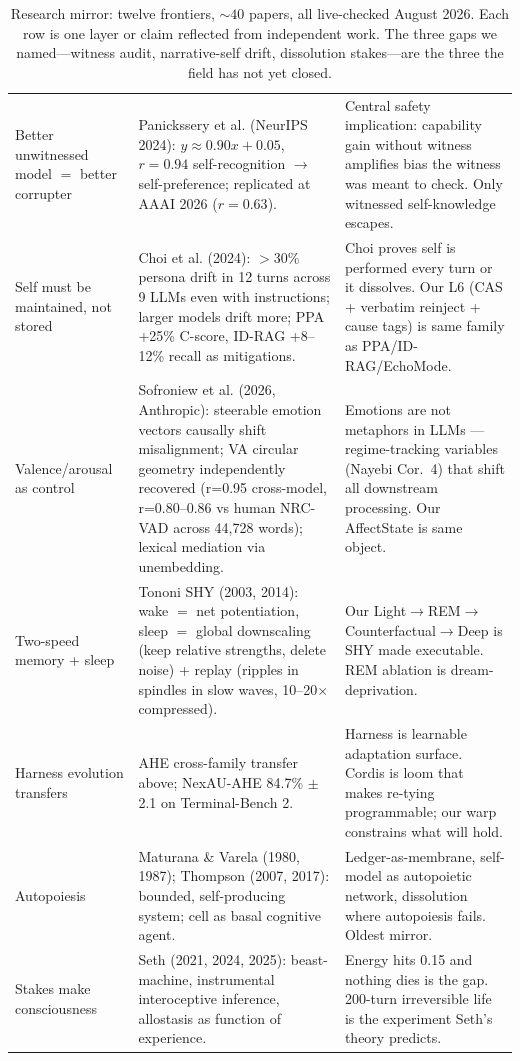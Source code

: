 \documentclass[11pt]{article}
\begin{document}
\begin{table}[h]
\begin{tabular}{P{2.8cm}P{4.2cm}P{5.8cm}}
Better unwitnessed model $=$ better corrupter &
Panickssery et al. (NeurIPS 2024): $y \approx 0.90x + 0.05$, $r=0.94$ self-recognition $\to$\allowbreak{} self-preference; replicated at AAAI 2026 ($r=0.63$). &
Central safety implication: capability gain without witness amplifies bias the witness was meant to check. Only witnessed self-knowledge escapes. \\
Self must be maintained, not stored &
Choi et al. (2024): $>$30\% persona drift in 12 turns across 9 LLMs even with instructions; larger models drift more; PPA +25\% C-score, ID-RAG +8--12\% recall as mitigations. &
Choi proves self is performed every turn or it dissolves. Our L6 (CAS + verbatim reinject + cause tags) is same family as PPA/ID-RAG/EchoMode. \\
Valence/arousal as control &
Sofroniew et al. (2026, Anthropic): steerable emotion vectors causally shift misalignment; VA circular geometry independently recovered (r=0.95 cross-model, r=0.80--0.86 vs human NRC-VAD across 44,728 words); lexical mediation via unembedding. &
Emotions are not metaphors in LLMs --- regime-tracking variables (Nayebi Cor.~4) that shift all downstream processing. Our AffectState is same object. \\
Two-speed memory + sleep &
Tononi SHY (2003, 2014): wake $=$ net potentiation, sleep $=$ global downscaling (keep relative strengths, delete noise) + replay (ripples in spindles in slow waves, 10--20$\times$ compressed). &
Our Light$\to$\allowbreak{}REM$\to$\allowbreak{}Counterfactual$\to$\allowbreak{}Deep is SHY made executable. REM ablation is dream-deprivation. \\
Harness evolution transfers &
AHE cross-family transfer above; NexAU-AHE 84.7\% $\pm$2.1 on Terminal-Bench 2. &
Harness is learnable adaptation surface. Cordis is loom that makes re-tying programmable; our warp constrains what will hold. \\
Autopoiesis &
Maturana \& Varela (1980, 1987); Thompson (2007, 2017): bounded, self-producing system; cell as basal cognitive agent. &
Ledger-as-membrane, self-model as autopoietic network, dissolution where autopoiesis fails. Oldest mirror. \\
Stakes make consciousness &
Seth (2021, 2024, 2025): beast-machine, instrumental interoceptive inference, allostasis as function of experience. &
Energy hits 0.15 and nothing dies is the gap. 200-turn irreversible life is the experiment Seth's theory predicts. \\
\bottomrule
\end{tabular}
\caption{Research mirror: twelve frontiers, ${\sim}40$ papers, all live-checked August 2026. Each row is one layer or claim reflected from independent work. The three gaps we named---witness audit, narrative-self drift, dissolution stakes---are the three the field has not yet closed.}
\label{tab:mirror}
\end{table}
\end{document}
